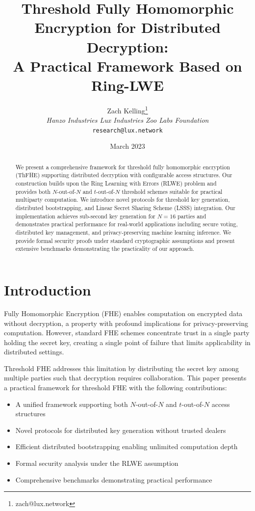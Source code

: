\documentclass[11pt,a4paper]{article}
\title{Threshold Fully Homomorphic Encryption for Distributed Decryption:\\A Practical Framework Based on Ring-LWE}
\author{Zach Kelling\thanks{zach@lux.network} \\ \textit{Hanzo Industries \quad Lux Industries \quad Zoo Labs Foundation} \\ \texttt{research@lux.network}}
\date{March 2023}
\begin{document}
\maketitle

\begin{abstract}
We present a comprehensive framework for threshold fully homomorphic encryption (ThFHE) supporting distributed decryption with configurable access structures. Our construction builds upon the Ring Learning with Errors (RLWE) problem and provides both $N$-out-of-$N$ and $t$-out-of-$N$ threshold schemes suitable for practical multiparty computation. We introduce novel protocols for threshold key generation, distributed bootstrapping, and Linear Secret Sharing Scheme (LSSS) integration. Our implementation achieves sub-second key generation for $N=16$ parties and demonstrates practical performance for real-world applications including secure voting, distributed key management, and privacy-preserving machine learning inference. We provide formal security proofs under standard cryptographic assumptions and present extensive benchmarks demonstrating the practicality of our approach.
\end{abstract}

\section{Introduction}

Fully Homomorphic Encryption (FHE) enables computation on encrypted data without decryption, a property with profound implications for privacy-preserving computation. However, standard FHE schemes concentrate trust in a single party holding the secret key, creating a single point of failure that limits applicability in distributed settings.

Threshold FHE addresses this limitation by distributing the secret key among multiple parties such that decryption requires collaboration. This paper presents a practical framework for threshold FHE with the following contributions:

\begin{itemize}
    \item A unified framework supporting both $N$-out-of-$N$ and $t$-out-of-$N$ access structures
    \item Novel protocols for distributed key generation without trusted dealers
    \item Efficient distributed bootstrapping enabling unlimited computation depth
    \item Formal security analysis under the RLWE assumption
    \item Comprehensive benchmarks demonstrating practical performance
\end{itemize}
\end{document}
